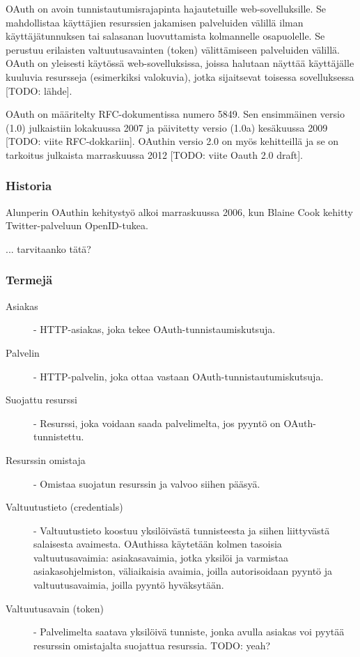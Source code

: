 OAuth on avoin tunnistautumisrajapinta hajautetuille web-sovelluksille. Se mahdollistaa käyttäjien resurssien jakamisen palveluiden välillä ilman käyttäjätunnuksen tai salasanan luovuttamista kolmannelle osapuolelle. Se perustuu erilaisten valtuutusavainten (token) välittämiseen palveluiden välillä. OAuth on yleisesti käytössä web-sovelluksissa, joissa halutaan näyttää käyttäjälle kuuluvia resursseja (esimerkiksi valokuvia), jotka sijaitsevat toisessa sovelluksessa [TODO: lähde].

OAuth on määritelty RFC-dokumentissa numero 5849. Sen ensimmäinen versio (1.0) julkaistiin lokakuussa 2007 ja päivitetty versio (1.0a) kesäkuussa 2009 [TODO: viite RFC-dokkariin]. OAuthin versio 2.0 on myös kehitteillä ja se on tarkoitus julkaista marraskuussa 2012 [TODO: viite Oauth 2.0 draft].

\subsubsection{Historia}

Alunperin OAuthin kehitystyö alkoi marraskuussa 2006, kun Blaine Cook kehitty Twitter-palveluun OpenID-tukea. 

... tarvitaanko tätä?

\subsubsection{Termejä}

\begin{description}
  \item[Asiakas] - HTTP-asiakas, joka tekee OAuth-tunnistaumiskutsuja.

  \item[Palvelin] - HTTP-palvelin, joka ottaa vastaan OAuth-tunnistautumiskutsuja.
  
  \item[Suojattu resurssi] - Resurssi, joka voidaan saada palvelimelta, jos pyyntö on OAuth-tunnistettu.
  
  \item[Resurssin omistaja] - Omistaa suojatun resurssin ja valvoo siihen pääsyä.
  
  \item[Valtuutustieto (credentials)] - Valtuutustieto koostuu yksilöivästä tunnisteesta ja siihen liittyvästä salaisesta avaimesta. OAuthissa käytetään kolmen tasoisia valtuutusavaimia: asiakasavaimia, jotka yksilöi ja varmistaa asiakasohjelmiston, väliaikaisia avaimia, joilla autorisoidaan pyyntö ja valtuutusavaimia, joilla pyyntö hyväksytään.
  
  \item[Valtuutusavain (token)] - Palvelimelta saatava yksilöivä tunniste, jonka avulla asiakas voi pyytää resurssin omistajalta suojattua resurssia. TODO: yeah?
\end{description}

